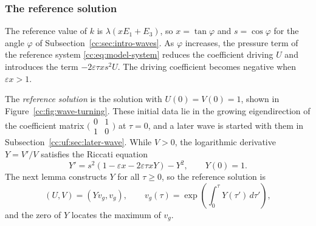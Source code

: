 \subsubsection{The reference solution}\label{cc:sec:scalar}
The reference value of $k$ is $\lambda(xE_1+E_3)$, so $x=\tan\varphi$
and $s=\cos\varphi$ for the angle $\varphi$ of
Subsection~\ref{cc:sec:intro-waves}. As $\varphi$ increases, the
pressure term of the reference system \eqref{cc:eq:model-system}
reduces the coefficient driving $U$ and introduces the term
$-2\varepsilon\tau xs^2U$. The driving coefficient
becomes negative when $\varepsilon x>1$.

The \emph{reference solution} is the solution with $U(0)=V(0)=1$,
shown in Figure~\ref{cc:fig:wave-turning}.
These initial data lie in the growing eigendirection of the coefficient
matrix $\bigl(\begin{smallmatrix}0&1\\1&0\end{smallmatrix}\bigr)$ at
$\tau=0$, and a later wave is started with them in
Subsection~\ref{cc:uf:sec:later-wave}. While $V>0$, the logarithmic
derivative $Y=V'/V$ satisfies the Riccati equation
\begin{equation}\label{cc:eq:model}
 Y'=s^2(1-\varepsilon x-2\varepsilon\tau xY)-Y^2,\qquad Y(0)=1.
\end{equation}
The next lemma constructs $Y$ for all $\tau\ge0$, so the reference
solution is
\[
 (U,V)=(Yv_g,v_g),\qquad
 v_g(\tau)=\exp\left(\int_0^\tau Y(\tau')\,d\tau'\right),
\]
and the zero of $Y$ locates the maximum of $v_g$.

